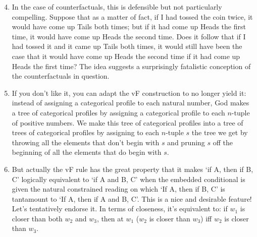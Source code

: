 \documentclass[If.tex]{subfiles}
\begin{document}
\begin{enumerate}
\setcounter{enumi}{3}
\item
  In the case of counterfactuals, this is defensible but not
  particularly compelling. Suppose that as a matter of fact, if I had
  tossed the coin twice, it would have come up Tails both times; but if
  it had come up Heads the first time, it would have come up Heads the
  second time. Does it follow that if I had tossed it and it came up
  Tails both times, it would still have been the case that it would have
  come up Heads the second time if it had come up Heads the first time?
  The idea suggests a surprisingly fatalistic conception of the
  counterfactuals in question.\\
\item
  If you don't like it, you can adapt the vF construction to no longer
  yield it: instead of assigning a categorical profile to each natural
  number, God makes a tree of categorical profiles by assigning a
  categorical profile to each $n$-tuple of positive numbers. We make
  this tree of categorical profiles into a tree of trees of categorical
  profiles by assigning to each $n$-tuple $s$ the tree we get by
  throwing all the elements that don't begin with $s$ and pruning
  $s$ off the beginning of all the elements that do begin with
  $s$.\\
\item
  But actually the vF rule has the great property that it makes ‘if A,
  then if B, C’ logically equivalent to ‘if A and B, C’ when the
  embedded conditional is given the natural constrained reading on which
  ‘If A, then if B, C’ is tantamount to ‘If A, then if A and B, C’. This
  is a nice and desirable feature! Let's tentatively endorse it. In
  terms of closeness, it's equivalent to: if $w_1$ is closer than both $w_2$
  and $w_3$, then at $w_1$ ($w_2$ is closer than $w_3$) iff $w_2$ is closer than $w_3$.
\end{enumerate}
\end{document}
